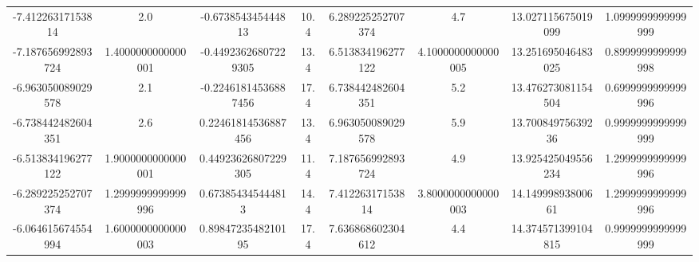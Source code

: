 \begin{table}
\begin{tabular}{S[]S[]S[]S[]S[]S[]S[]S[]}
-7.41226317153814 & 2.0                     & -0.673854345444813 & 10.4                 & 6.289225252707374 & 4.7                 & 13.027115675019099 & 1.0999999999999999\\
-7.187656992893724 & 1.4000000000000001     & -0.44923626807229305 & 13.4               & 6.513834196277122 & 4.1000000000000005  & 13.251695046483025 & 0.8999999999999998\\
-6.963050089029578 & 2.1                    & -0.22461814536887456 & 17.4               & 6.738442482604351 & 5.2                 & 13.476273081154504 & 0.6999999999999996\\
-6.738442482604351 & 2.6                    & 0.22461814536887456 & 13.4                & 6.963050089029578 & 5.9                 & 13.70084975639236 & 0.9999999999999999\\
-6.513834196277122 & 1.9000000000000001     & 0.44923626807229305 & 11.4                & 7.187656992893724 & 4.9                 & 13.925425049556234 & 1.2999999999999996\\
-6.289225252707374 & 1.2999999999999996     & 0.673854345444813 & 14.4                  & 7.41226317153814 & 3.8000000000000003   & 14.14999893800661 & 1.2999999999999996\\
-6.064615674554994 & 1.6000000000000003     & 0.8984723548210195 & 17.4                 & 7.636868602304612 & 4.4                 & 14.374571399104815 & 0.9999999999999999\\
































\bottomrule
\end{tabular}\end{table}